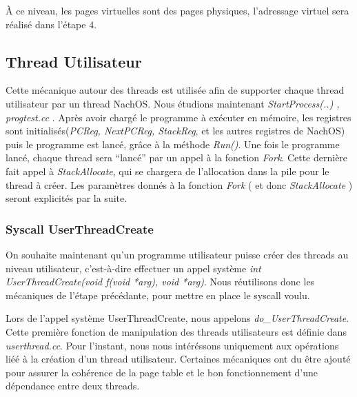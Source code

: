 \documentclass[a4paper,10pt]{article}
\begin{document}
À ce niveau, les pages virtuelles sont des pages physiques, l'adressage virtuel sera réalisé dans l'étape 4.

\newpage
\subsection{Thread Utilisateur}
Cette mécanique autour des threads est utilisée afin de supporter chaque thread utilisateur par un thread NachOS.
Nous étudions maintenant \textit{StartProcess(..) , progtest.cc }. Après avoir chargé le programme à exécuter en mémoire,
les registres sont initialisés(\textit{PCReg, NextPCReg, StackReg}, et les autres registres de NachOS) puis le programme est lancé, grâce à la méthode \textit{Run()}.
Une fois le programme lancé, chaque thread sera ``lancé'' par un appel à la fonction \textit{Fork}. Cette dernière fait appel à \textit{StackAllocate}, qui se chargera
de l'allocation dans la pile pour le thread à créer. Les paramètres donnés à la fonction \textit{Fork} ( et donc \textit{StackAllocate} ) seront explicités par la suite.
\subsubsection{Syscall UserThreadCreate}
On souhaite maintenant qu’un programme utilisateur puisse créer des threads au niveau utilisateur,
c’est-à-dire effectuer un appel système \textit{int UserThreadCreate(void f(void *arg), void *arg)}.
Nous réutilisons donc les mécaniques de l'étape précédante, pour mettre en place le syscall voulu.

Lors de l'appel système UserThreadCreate, nous appelons \textit{do\_UserThreadCreate}.
Cette première fonction de manipulation des threads utilisateurs est définie dans \textit{userthread.cc}.
Pour l'instant, nous nous intéréssons uniquement aux opérations liéé à la création d'un thread utilisateur.
Certaines mécaniques ont du être ajouté pour assurer la cohérence de la page table et le bon fonctionnement d'une dépendance
entre deux threads.
\end{document}

